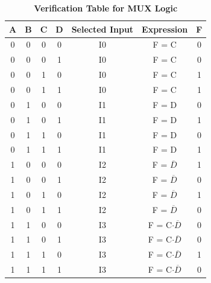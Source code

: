 \documentclass[twocolumn]{article}
\begin{document}
\begin{table}[h]
\centering
\renewcommand{\arraystretch}{1.3}
\begin{tabular}{|c|c|c|c|c|c|c|}
\hline
A & B & C & D & Selected Input & Expression & F \\
\hline
0 & 0 & 0 & 0 & I0 & F = C             & 0 \\
0 & 0 & 0 & 1 & I0 & F = C             & 0 \\
0 & 0 & 1 & 0 & I0 & F = C             & 1 \\
0 & 0 & 1 & 1 & I0 & F = C             & 1 \\
0 & 1 & 0 & 0 & I1 & F = D             & 0 \\
0 & 1 & 0 & 1 & I1 & F = D             & 1 \\
0 & 1 & 1 & 0 & I1 & F = D             & 0 \\
0 & 1 & 1 & 1 & I1 & F = D             & 1 \\
1 & 0 & 0 & 0 & I2 & F = $\overline{D}$ & 1 \\
1 & 0 & 0 & 1 & I2 & F = $\overline{D}$ & 0 \\
1 & 0 & 1 & 0 & I2 & F = $\overline{D}$ & 1 \\
1 & 0 & 1 & 1 & I2 & F = $\overline{D}$ & 0 \\
1 & 1 & 0 & 0 & I3 & F = C$\cdot\overline{D}$ & 0 \\
1 & 1 & 0 & 1 & I3 & F = C$\cdot\overline{D}$ & 0 \\
1 & 1 & 1 & 0 & I3 & F = C$\cdot\overline{D}$ & 1 \\
1 & 1 & 1 & 1 & I3 & F = C$\cdot\overline{D}$ & 0 \\
\hline
\end{tabular}
\caption*{\textbf{Verification Table for MUX Logic}}
\end{table}
\end{document}
